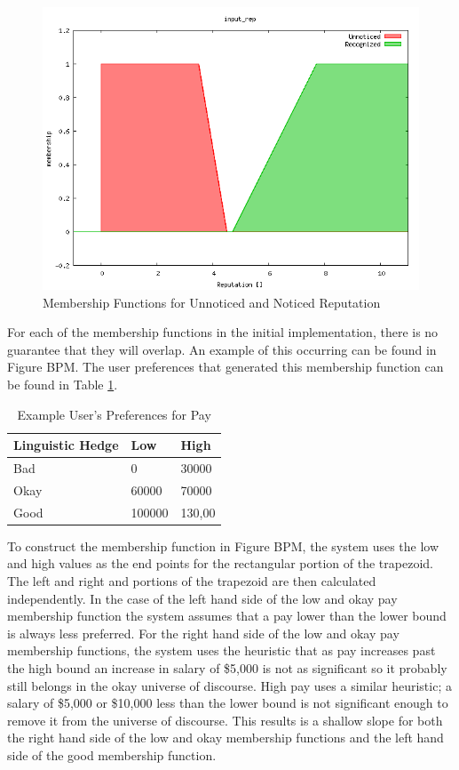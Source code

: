 \documentclass[12pt,fleqn,reqno,letterpaper]{article}
\begin{document}
\begin{figure}[H]
  \centering
  \includegraphics[scale=0.5,natwidth=640,natheight=480]{fig/baseline_input_rep.png}
  \caption{Membership Functions for Unnoticed and Noticed Reputation}
  \label{fig:BRM}
\end{figure}

For each of the membership functions in the initial implementation, there is no guarantee that they will overlap. An example of this occurring can be found in Figure BPM. The user preferences that generated this membership function can be found in Table \ref{tbl:USER-PAY-PREF}.

\begin{table}[H]
  \caption{Example User’s Preferences for Pay}
  \label{tbl:USER-PAY-PREF}
  \centering
\begin{tabular}{|l|l|l|}
\hline
\textbf{Linguistic Hedge} & \textbf{Low} & \textbf{High} \\ \hline
Bad                       & 0            & 30000         \\ \hline
Okay                      & 60000        & 70000         \\ \hline
Good                      & 100000       & 130,00        \\ \hline
\end{tabular}
\end{table}
To construct the membership function in Figure BPM, the system uses the low and high values as the end points for the rectangular portion of the trapezoid. The left and right and portions of the trapezoid are then calculated independently. In the case of the left hand side of the low and okay pay membership function the system assumes that a pay lower than the lower bound is always less preferred. For the right hand side of the low and okay pay membership functions, the system uses the heuristic that as pay increases past the high bound an increase in salary of \$5,000 is not as significant so it probably still belongs in the okay universe of discourse. High pay uses a similar heuristic; a salary of \$5,000 or \$10,000 less than the lower bound is not significant enough to remove it from the universe of discourse. This results is a shallow slope for both the right hand side of the low and okay membership functions and the left hand side of the good membership function.
\end{document}
